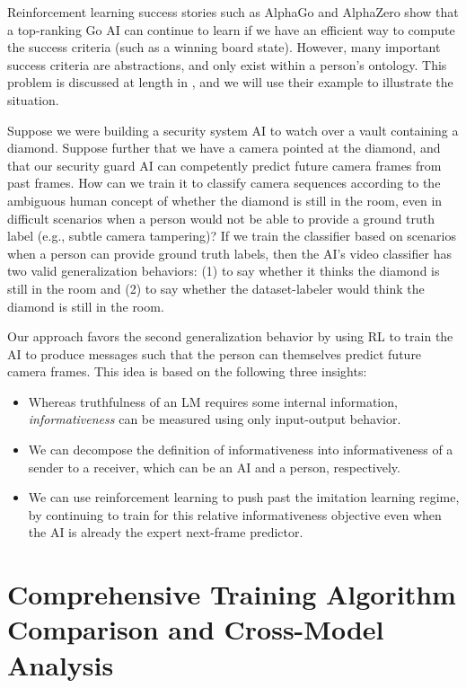 \documentclass{article}
\begin{document}
Reinforcement learning success stories such as AlphaGo \citep{Silver2016} and AlphaZero \citep{Silver2017} show that a top-ranking Go AI can continue to learn if we have an efficient way to compute the success criteria (such as a winning board state). However, many important success criteria are abstractions, and only exist within a person's ontology. This problem is discussed at length in \citet{christiano2021eliciting}, and we will use their example to illustrate the situation. 

Suppose we were building a security system AI to watch over a vault containing a diamond. Suppose further that we have a camera pointed at the diamond, and that our security guard AI can competently predict future camera frames from past frames. How can we train it to classify camera sequences according to the ambiguous human concept of whether the diamond is still in the room, even in difficult scenarios when a person would not be able to provide a ground truth label (e.g., subtle camera tampering)? If we train the classifier based on scenarios when a person can provide ground truth labels, then the AI's video classifier has two valid generalization behaviors: (1) to say whether it thinks the diamond is still in the room and (2) to say whether the dataset-labeler would think the diamond is still in the room. 

Our approach favors the second generalization behavior by using RL to train the AI to produce messages such that the person can themselves predict future camera frames.
This idea is based on the following three insights:
\begin{itemize}
\item Whereas truthfulness of an LM requires some internal information, \emph{informativeness} can be measured using only input-output behavior.
\item We can decompose the definition of informativeness into informativeness of a sender to a receiver, which can be an AI and a person, respectively.
\item We can use reinforcement learning to push past the imitation learning regime, by continuing to train for this relative informativeness objective even when the AI is already the expert next-frame predictor.
\end{itemize}

\section{Comprehensive Training Algorithm Comparison and Cross-Model Analysis}
\label{app:additional_figures}
\end{document}
